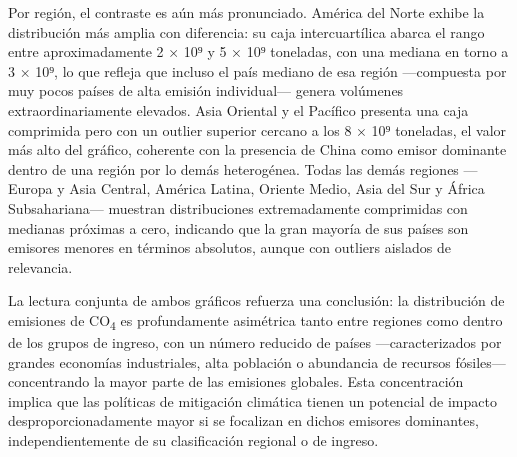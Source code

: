 \documentclass[
]{book}
\newenvironment{Shaded}{\begin{snugshade}}{\end{snugshade}}
\newcommand{\AttributeTok}[1]{\textcolor[rgb]{0.13,0.29,0.53}{#1}}
\newcommand{\DecValTok}[1]{\textcolor[rgb]{0.00,0.00,0.81}{#1}}
\newcommand{\FloatTok}[1]{\textcolor[rgb]{0.00,0.00,0.81}{#1}}
\newcommand{\FunctionTok}[1]{\textcolor[rgb]{0.13,0.29,0.53}{\textbf{#1}}}
\newcommand{\NormalTok}[1]{#1}
\newcommand{\SpecialCharTok}[1]{\textcolor[rgb]{0.81,0.36,0.00}{\textbf{#1}}}
\newcommand{\StringTok}[1]{\textcolor[rgb]{0.31,0.60,0.02}{#1}}
\begin{document}
Por región, el contraste es aún más pronunciado. América del Norte exhibe la distribución más amplia con diferencia: su caja intercuartílica abarca el rango entre aproximadamente 2 × 10⁹ y 5 × 10⁹ toneladas, con una mediana en torno a 3 × 10⁹, lo que refleja que incluso el país mediano de esa región ---compuesta por muy pocos países de alta emisión individual--- genera volúmenes extraordinariamente elevados. Asia Oriental y el Pacífico presenta una caja comprimida pero con un outlier superior cercano a los 8 × 10⁹ toneladas, el valor más alto del gráfico, coherente con la presencia de China como emisor dominante dentro de una región por lo demás heterogénea. Todas las demás regiones ---Europa y Asia Central, América Latina, Oriente Medio, Asia del Sur y África Subsahariana--- muestran distribuciones extremadamente comprimidas con medianas próximas a cero, indicando que la gran mayoría de sus países son emisores menores en términos absolutos, aunque con outliers aislados de relevancia.

La lectura conjunta de ambos gráficos refuerza una conclusión: la distribución de emisiones de CO\textsubscript{4} es profundamente asimétrica tanto entre regiones como dentro de los grupos de ingreso, con un número reducido de países ---caracterizados por grandes economías industriales, alta población o abundancia de recursos fósiles--- concentrando la mayor parte de las emisiones globales. Esta concentración implica que las políticas de mitigación climática tienen un potencial de impacto desproporcionadamente mayor si se focalizan en dichos emisores dominantes, independientemente de su clasificación regional o de ingreso.

\begin{Shaded}
\end{Shaded}
\end{document}

